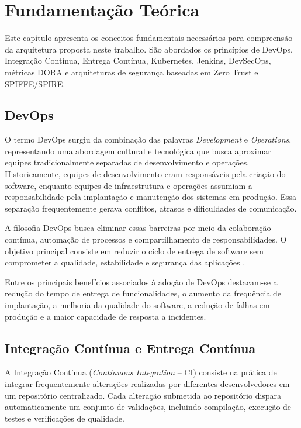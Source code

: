 \chapter{Fundamentação Teórica}
\label{cap:fundamentacao-teorica}

Este capítulo apresenta os conceitos fundamentais necessários para compreensão da arquitetura proposta neste trabalho. São abordados os princípios de DevOps, Integração Contínua, Entrega Contínua, Kubernetes, Jenkins, DevSecOps, métricas DORA e arquiteturas de segurança baseadas em Zero Trust e SPIFFE/SPIRE.

\section{DevOps}
\label{sec:devops}

O termo DevOps surgiu da combinação das palavras \textit{Development} e \textit{Operations}, representando uma abordagem cultural e tecnológica que busca aproximar equipes tradicionalmente separadas de desenvolvimento e operações. Historicamente, equipes de desenvolvimento eram responsáveis pela criação do software, enquanto equipes de infraestrutura e operações assumiam a responsabilidade pela implantação e manutenção dos sistemas em produção. Essa separação frequentemente gerava conflitos, atrasos e dificuldades de comunicação.

A filosofia DevOps busca eliminar essas barreiras por meio da colaboração contínua, automação de processos e compartilhamento de responsabilidades. O objetivo principal consiste em reduzir o ciclo de entrega de software sem comprometer a qualidade, estabilidade e segurança das aplicações \cite{dora2024,gitlab2024}.

Entre os principais benefícios associados à adoção de DevOps destacam-se a redução do tempo de entrega de funcionalidades, o aumento da frequência de implantação, a melhoria da qualidade do software, a redução de falhas em produção e a maior capacidade de resposta a incidentes.

\section{Integração Contínua e Entrega Contínua}
\label{sec:ci-cd}

A Integração Contínua (\textit{Continuous Integration} -- CI) consiste na prática de integrar frequentemente alterações realizadas por diferentes desenvolvedores em um repositório centralizado. Cada alteração submetida ao repositório dispara automaticamente um conjunto de validações, incluindo compilação, execução de testes e verificações de qualidade.


